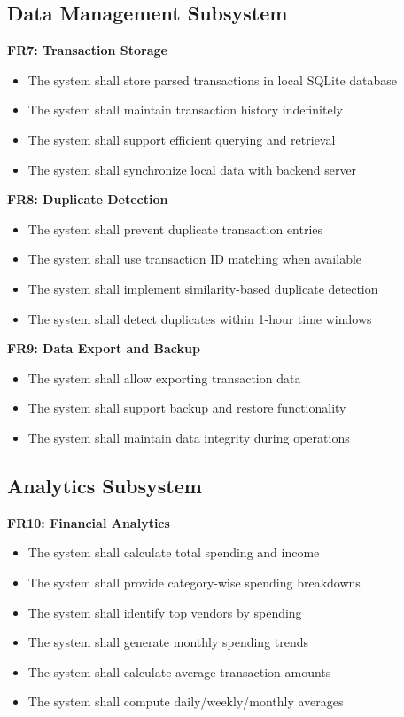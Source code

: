\documentclass[11pt,a4paper]{report}
\begin{document}
\subsection{Data Management Subsystem}

\textbf{FR7: Transaction Storage}
\begin{itemize}
    \item The system shall store parsed transactions in local SQLite database
    \item The system shall maintain transaction history indefinitely
    \item The system shall support efficient querying and retrieval
    \item The system shall synchronize local data with backend server
\end{itemize}

\textbf{FR8: Duplicate Detection}
\begin{itemize}
    \item The system shall prevent duplicate transaction entries
    \item The system shall use transaction ID matching when available
    \item The system shall implement similarity-based duplicate detection
    \item The system shall detect duplicates within 1-hour time windows
\end{itemize}

\textbf{FR9: Data Export and Backup}
\begin{itemize}
    \item The system shall allow exporting transaction data
    \item The system shall support backup and restore functionality
    \item The system shall maintain data integrity during operations
\end{itemize}

\subsection{Analytics Subsystem}

\textbf{FR10: Financial Analytics}
\begin{itemize}
    \item The system shall calculate total spending and income
    \item The system shall provide category-wise spending breakdowns
    \item The system shall identify top vendors by spending
    \item The system shall generate monthly spending trends
    \item The system shall calculate average transaction amounts
    \item The system shall compute daily/weekly/monthly averages
\end{itemize}
\end{document}
